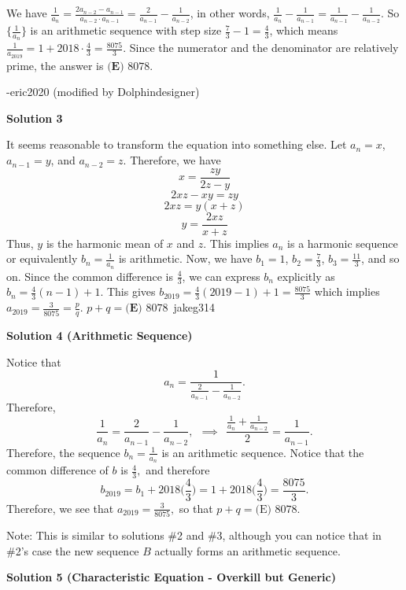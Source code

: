 \begin{enumerate}
We have $\frac{1}{a_n} = \frac{2a_{n-2}-a_{n-1}}{a_{n-2} \cdot a_{n-1}}=\frac{2}{a_{n-1}}-\frac{1}{a_{n-2}}$, in other words, $\frac{1}{a_n}-\frac{1}{a_{n-1}} = \frac{1}{a_{n-1}}-\frac{1}{a_{n-2}}$. So $\{\frac{1}{a_n}\}$ is an arithmetic sequence with step size $\frac{7}{3}-1=\frac{4}{3}$, which means $\frac{1}{a_{2019}} = 1+2018 \cdot \frac{4}{3} = \frac{8075}{3}$. Since the numerator and the denominator are relatively prime, the answer is $\boxed{\textbf{(E) } 8078}$.

 -eric2020 (modified by Dolphindesigner)

 



\textbf{Solution 3}

It seems reasonable to transform the equation into something else. Let $a_{n}=x$, $a_{n-1}=y$, and $a_{n-2}=z$. Therefore, we have 
 \[x=\frac{zy}{2z-y}\]
 \[2xz-xy=zy\]
 \[2xz=y(x+z)\]
 \[y=\frac{2xz}{x+z}\]Thus, $y$ is the harmonic mean of $x$ and $z$. This implies $a_{n}$ is a harmonic sequence or equivalently $b_{n}=\frac{1}{a_{n}}$ is arithmetic. Now, we have $b_{1}=1$, $b_{2}=\frac{7}{3}$, $b_{3}=\frac{11}{3}$, and so on. Since the common difference is $\frac{4}{3}$, we can express $b_{n}$ explicitly as $b_{n}=\frac{4}{3}(n-1)+1$. This gives $b_{2019}=\frac{4}{3}(2019-1)+1=\frac{8075}{3}$ which implies $a_{2019}=\frac{3}{8075}=\frac{p}{q}$. $p+q=\boxed{\textbf{(E) } 8078}$~jakeg314

 



\textbf{Solution 4 (Arithmetic Sequence)}

Notice that
 \[a_n = \frac{1}{\frac{2}{a_{n-1}} - \frac{1}{a_{n-2}}}.\]Therefore,
 \[\frac{1}{a_n} = \frac{2}{a_{n-1}} - \frac{1}{a_{n-2}}, \ \ \implies \ \ \frac{\frac{1}{a_n} + \frac{1}{a_{n-2}}}{2} = \frac{1}{a_{n-1}}.\]Therefore, the sequence $b_n = \frac{1}{a_n}$ is an arithmetic sequence. Notice that the common difference of $b$ is $\frac{4}{3},$ and therefore
 \[b_{2019} = b_1 + 2018 \bigg(\frac{4}{3}\bigg) = 1 + 2018 \bigg(\frac{4}{3} \bigg) = \frac{8075}{3}.\]Therefore, we see that $a_{2019} = \frac{3}{8075},$ so that $p + q = \boxed{\text{(E) } 8078}.$

 Note: This is similar to solutions \#2 and \#3, although you can notice that in \#2's case the new sequence $B$ actually forms an arithmetic sequence.

 



\textbf{Solution 5 (Characteristic Equation - Overkill but Generic)}


\end{enumerate}
